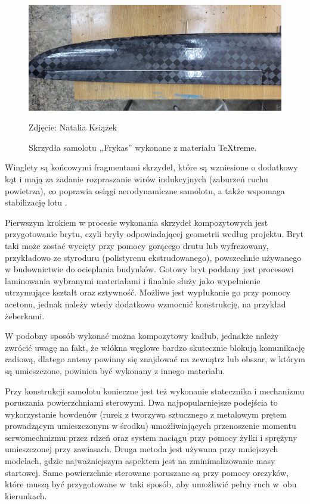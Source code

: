 \documentclass[12pt, a4paper]{article}
\begin{document}
 \begin{figure}[ht]
    \centering
    \includegraphics[width=1\textwidth]{frykas}
    \caption{Skrzydła samolotu ,,Frykas'' wykonane z materiału TeXtreme.}
    \small Zdjęcie: Natalia Książek
    \label{fig:frykas}
\end{figure}


Winglety są końcowymi fragmentami skrzydeł, które są wzniesione o dodatkowy kąt i mają za zadanie rozpraszanie wirów indukcyjnych (zaburzeń ruchu powietrza), co poprawia osiągi aerodynamiczne samolotu, a także wspomaga stabilizację lotu \cite{Bielawski2015}.

Pierwszym krokiem w procesie wykonania skrzydeł kompozytowych jest przygotowanie brytu, czyli bryły odpowiadającej geometrii według projektu. Bryt taki może zostać wycięty przy pomocy gorącego drutu lub wyfrezowany, przykładowo ze styroduru (polistyrenu ekstrudowanego), powszechnie używanego w budownictwie do ocieplania budynków. Gotowy bryt poddany jest procesowi laminowania wybranymi materiałami i finalnie służy jako wypełnienie utrzymujące kształt oraz sztywność. Możliwe jest wypłukanie go przy pomocy acetonu, jednak należy wtedy dodatkowo wzmocnić konstrukcję, na przykład żeberkami. 

W podobny sposób wykonać można kompozytowy kadłub, jednakże należy zwrócić uwagę na fakt, że włókna węglowe bardzo skutecznie blokują komunikację radiową, dlatego anteny powinny się znajdować na zewnątrz lub obszar, w którym są umieszczone, powinien być wykonany z innego materiału.

Przy konstrukcji samolotu konieczne jest też wykonanie statecznika i mechanizmu poruszania powierzchniami sterowymi. Dwa najpopularniejsze podejścia to wykorzystanie bowdenów (rurek z tworzywa sztucznego z metalowym prętem prowadzącym umieszczonym w środku) umożliwiających przenoszenie momentu serwomechnizmu przez rdzeń oraz system naciągu przy pomocy żyłki i sprężyny umieszczonej przy zawiasach. Druga metoda jest używana przy mniejszych modelach, gdzie najważniejszym aspektem jest na zminimalizowanie masy startowej. Same powierzchnie sterowane poruszane są przy pomocy orczyków, które muszą być przygotowane w~taki sposób, aby umożliwić pełny ruch w~obu kierunkach.
\end{document}
